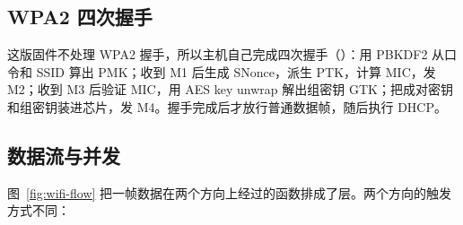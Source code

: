 \subsection{WPA2 四次握手}

这版固件不处理 WPA2 握手，所以主机自己完成四次握手（）：用 PBKDF2 从口令和 SSID 算出 PMK；收到 M1 后生成 SNonce，派生 PTK，计算 MIC，发 M2；收到 M3 后验证 MIC，用 AES key unwrap 解出组密钥 GTK；把成对密钥和组密钥装进芯片，发 M4。握手完成后才放行普通数据帧，随后执行 DHCP。

\subsection{数据流与并发}
\label{sec:wifi-flow}

图~\ref{fig:wifi-flow} 把一帧数据在两个方向上经过的函数排成了层。两个方向的触发方式不同：

